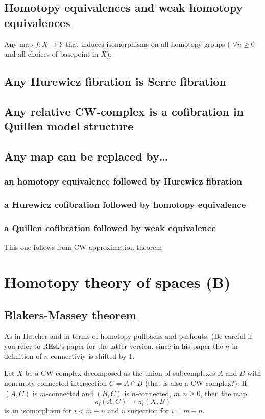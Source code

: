\subsection{Homotopy equivalences and weak homotopy equivalences}

\begin{defn}
	Any map $f:X\to Y$ that induces isomorphisms on all homotopy groups ( $\forall n\geq 0$ and all choices of basepoint in $X$).
\end{defn}

\subsection*{Any Hurewicz fibration is Serre fibration}
\subsection*{Any relative CW-complex is a cofibration in Quillen model structure}
\subsection*{Any map can be replaced by…} 
\subsubsection*{an homotopy equivalence followed by Hurewicz fibration}
\subsubsection*{a Hurewicz cofibration followed by homotopy equivalence}
\subsubsection*{a Quillen cofibration followed by weak equivalence}
This one follows from CW-approximation theorem

\section*{Homotopy theory  of spaces (B)}

\subsection{Blakers-Massey theorem}

As in Hatcher and in terms of homotopy pullbacks and pushouts. (Be careful if you refer to REsk's paper for the latter version, since in his paper the $n$ in definition of $n$-connectiviy is shifted by $1$.
\begin{thm}
	Let $X$ be a CW complex decomposed as the union of subcomplexes $A$ and $B$ with nonempty connected intersection $C=A\cap B$ {\color{magenta}(that is also a CW complex?)}. If $(A,C)$ is $m$-connected and $(B,C)$ is $n$-connected, $m,n\geq 0$, then the map
	\[\pi_{i}(A,C)\to \pi_{i}(X,B)\]
is an isomorphism for $i<m+n$ and a surjection for $i=m+n$.
\end{thm}

